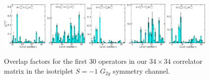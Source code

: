\begin{figure}[H]
    \includegraphics[width=0.1975\textwidth]{figures/sigmas/g2g/zfactors/zfactor_isotriplet_pion_lambda-G2g_1-P111-A2m-SS_0-P-1-1-1-G-SS_0.pdf}
    \includegraphics[width=0.18\textwidth]{figures/sigmas/g2g/zfactors/zfactor_isotriplet_pion_sigma-G2g_1-P000-A1um-SS_0-P000-G2u-SD_8.pdf}
    \includegraphics[width=0.18\textwidth]{figures/sigmas/g2g/zfactors/zfactor_isotriplet_pion_sigma-G2g_1-P001-A2m-SS_1-P00-1-G2-SS_0.pdf}
    \includegraphics[width=0.18\textwidth]{figures/sigmas/g2g/zfactors/zfactor_isotriplet_pion_sigma-G2g_1-P001-A2m-SS_1-P00-1-G2-SS_1.pdf}
    \includegraphics[width=0.18\textwidth]{figures/sigmas/g2g/zfactors/zfactor_isotriplet_pion_sigma-G2g_1-P011-A2m-SS_0-P0-1-1-G-SS_1.pdf}
    \caption{Overlap factors for the first 30 operators in our $34\times 34$ correlator matrix in the isotriplet $S=-1$ $G_{2g}$ symmetry channel.}\label{fig:g2g_zfactors1}
\end{figure}

